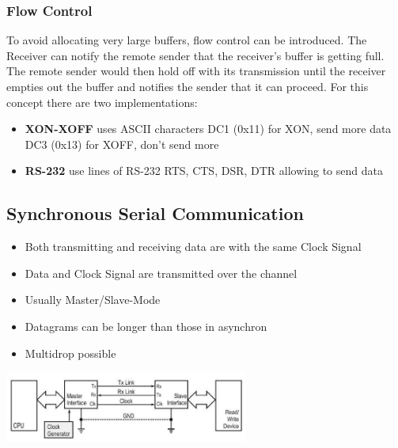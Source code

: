 \subsubsection{Flow Control}
To avoid allocating very large buffers, flow control can be introduced.
The Receiver can notify the remote sender that the receiver's buffer is getting full.
The remote sender would then hold off with its transmission until the receiver empties out the buffer and notifies the sender that it can proceed.
For this concept there are two implementations:
\begin{itemize}
	\item \textbf{XON-XOFF} uses \acs{ASCII} characters
	\subitem DC1 (0x11) for XON, send more data
	\subitem DC3 (0x13) for XOFF, don't send more
	\item \textbf{RS-232} use lines of RS-232
	\subitem \acs{RTS}, \acs{CTS}, \acs{DSR}, \acs{DTR} allowing to send data
\end{itemize}
\subsection{Synchronous Serial Communication }
\begin{minipage}{11cm}
	\begin{itemize}
		\item Both transmitting and receiving data are with the same Clock Signal
		\item Data and Clock Signal are transmitted over the channel
		\item Usually Master/Slave-Mode
		\item Datagrams can be longer than those in asynchron
		\item Multidrop possible
	\end{itemize}
\end{minipage}
\begin{minipage}{8cm}
	\includegraphics[width=8cm]{images/syn}
\end{minipage}
